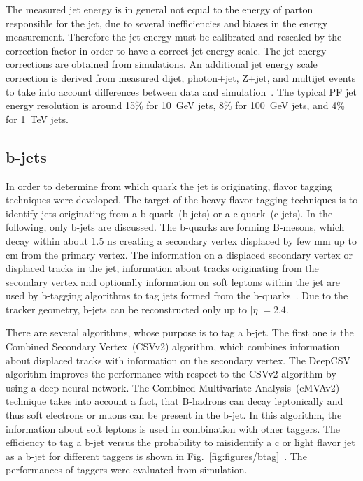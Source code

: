 The measured jet energy is in general not equal to the energy of parton responsible for the jet, due to several inefficiencies and biases in the energy measurement. Therefore the jet energy must be calibrated and rescaled by the correction factor in order to have a correct jet energy scale. The jet energy corrections are obtained from simulations. An additional jet energy scale correction is derived from measured dijet, photon+jet, Z+jet, and multijet events to take into account differences between data and simulation~\cite{Khachatryan:2016kdb}. The typical PF jet energy resolution is around 15\% for 10~GeV jets, 8\% for 100~GeV jets, and 4\% for 1~TeV jets. %

\subsection{b-jets}

In order to determine from which quark the jet is originating, flavor tagging techniques were developed. The target of the heavy flavor tagging techniques is to identify jets originating from a b quark~(b-jets) or a c quark~(c-jets). In the following, only b-jets are discussed. The b-quarks are forming B-mesons, which decay within about 1.5 ns creating a secondary vertex  displaced by few mm up to cm from the primary vertex. The information on a displaced secondary vertex or displaced tracks in the jet, information about tracks originating from the secondary vertex and optionally information on soft leptons within the jet are used by b-tagging algorithms to tag jets formed from the b-quarks~\cite{Sirunyan:2017ezt}. Due to the tracker geometry, b-jets can be reconstructed only up to $|\eta|=2.4$.

There are several algorithms, whose purpose is to tag a b-jet. The first one is the Combined Secondary Vertex~(CSVv2) algorithm, which combines information about displaced tracks with information on the secondary vertex. The DeepCSV algorithm improves the performance with respect to the CSVv2 algorithm by using a deep neural network. The Combined Multivariate Analysis~(cMVAv2) technique takes into account a fact, that B-hadrons can decay leptonically and thus soft electrons or muons can be present in the b-jet. In this algorithm, the information about soft leptons is used in combination with other taggers. The efficiency to tag a b-jet versus the probability to misidentify a c or light flavor jet as a b-jet for different taggers is shown in Fig.~\ref{fig:figures/btag}~\cite{Sirunyan:2017ezt}. The performances of taggers were evaluated from simulation.


